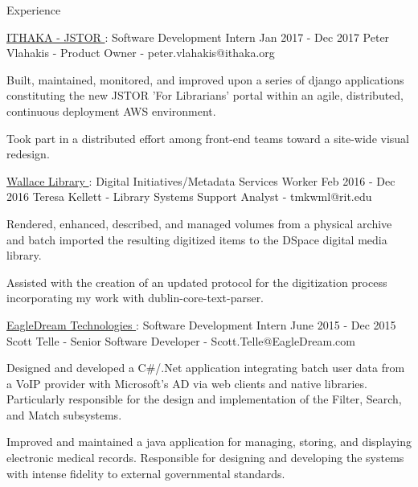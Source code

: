 \documentclass{resume} %
\begin{document}
  \begin{rSection}{Experience}

    \begin{rSubsection}{\underline{ITHAKA - JSTOR }: Software Development Intern }{ Jan 2017 - Dec 2017 }{ Peter Vlahakis - Product Owner - peter.vlahakis@ithaka.org }

      \item Built, maintained, monitored, and improved upon a series of django applications constituting the new JSTOR 'For Librarians' portal within an agile, distributed, continuous deployment AWS environment.

      \item Took part in a distributed effort among front-end teams toward a site-wide visual redesign.

    \end{rSubsection}

    \begin{rSubsection}{\underline{Wallace Library }: Digital Initiatives/Metadata Services Worker }{ Feb 2016 - Dec 2016 }{ Teresa Kellett - Library Systems Support Analyst - tmkwml@rit.edu }

      \item Rendered, enhanced, described, and managed volumes from a physical archive and batch imported the resulting digitized items to the DSpace digital media library.

      \item Assisted with the creation of an updated protocol for the digitization process incorporating my work with dublin-core-text-parser.

    \end{rSubsection}

    \begin{rSubsection}{\underline{EagleDream Technologies }: Software Development Intern }{ June 2015 - Dec 2015 }{ Scott Telle - Senior Software Developer - Scott.Telle@EagleDream.com }

      \item Designed and developed a C\#/.Net application integrating batch user data from a VoIP provider with Microsoft’s AD via web clients and native libraries. Particularly responsible for the design and implementation of the Filter, Search, and Match subsystems.

      \item Improved and maintained a java application for managing, storing, and displaying electronic medical records. Responsible for designing and developing the systems with intense fidelity to external governmental standards.

    \end{rSubsection}

  \end{rSection}
\end{document}
